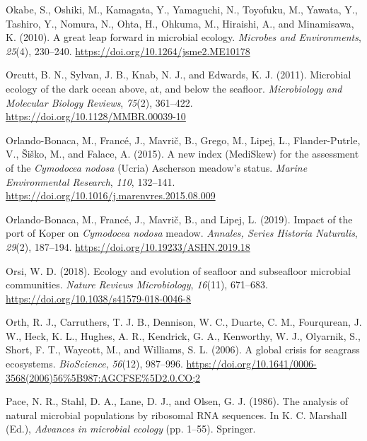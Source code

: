 \documentclass[
  12 pt,
]{book}
\newlength{\cslhangindent}
\newlength{\cslentryspacingunit} %
\newenvironment{CSLReferences}[2] %
 {%
  \setlength{\parindent}{0pt}
  \ifodd #1
  \let\oldpar\par
  \def\par{\hangindent=\cslhangindent\oldpar}
  \fi
  \setlength{\parskip}{#2\cslentryspacingunit}
 }%
 {}
\begin{document}
\begin{CSLReferences}{1}{0}
\leavevmode{}%
Okabe, S., Oshiki, M., Kamagata, Y., Yamaguchi, N., Toyofuku, M., Yawata, Y., Tashiro, Y., Nomura, N., Ohta, H., Ohkuma, M., Hiraishi, A., and Minamisawa, K. (2010). A great leap forward in microbial ecology. \emph{Microbes and Environments}, \emph{25}(4), 230--240. \url{https://doi.org/10.1264/jsme2.ME10178}

\leavevmode{}%
Orcutt, B. N., Sylvan, J. B., Knab, N. J., and Edwards, K. J. (2011). Microbial ecology of the dark ocean above, at, and below the seafloor. \emph{Microbiology and Molecular Biology Reviews}, \emph{75}(2), 361--422. \url{https://doi.org/10.1128/MMBR.00039-10}

\leavevmode{}%
Orlando-Bonaca, M., Francé, J., Mavrič, B., Grego, M., Lipej, L., Flander-Putrle, V., Šiško, M., and Falace, A. (2015). A new index ({MediSkew}) for the assessment of the {{\emph{Cymodocea nodosa}}} ({Ucria}) {Ascherson} meadow's status. \emph{Marine Environmental Research}, \emph{110}, 132--141. \url{https://doi.org/10.1016/j.marenvres.2015.08.009}

\leavevmode{}%
Orlando-Bonaca, M., Francé, J., Mavrič, B., and Lipej, L. (2019). Impact of the port of {Koper} on {{\emph{Cymodocea nodosa}}} meadow. \emph{Annales, Series Historia Naturalis}, \emph{29}(2), 187--194. \url{https://doi.org/10.19233/ASHN.2019.18}

\leavevmode{}%
Orsi, W. D. (2018). Ecology and evolution of seafloor and subseafloor microbial communities. \emph{Nature Reviews Microbiology}, \emph{16}(11), 671--683. \url{https://doi.org/10.1038/s41579-018-0046-8}

\leavevmode{}%
Orth, R. J., Carruthers, T. J. B., Dennison, W. C., Duarte, C. M., Fourqurean, J. W., Heck, K. L., Hughes, A. R., Kendrick, G. A., Kenworthy, W. J., Olyarnik, S., Short, F. T., Waycott, M., and Williams, S. L. (2006). A global crisis for seagrass ecosystems. \emph{BioScience}, \emph{56}(12), 987--996. \url{https://doi.org/10.1641/0006-3568(2006)56\%5B987:AGCFSE\%5D2.0.CO;2}

\leavevmode{}%
Pace, N. R., Stahl, D. A., Lane, D. J., and Olsen, G. J. (1986). The analysis of natural microbial populations by ribosomal {RNA} sequences. In K. C. Marshall (Ed.), \emph{Advances in microbial ecology} (pp. 1--55). Springer.


\end{CSLReferences}
\end{document}
